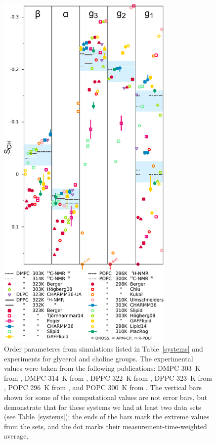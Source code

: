 \documentclass[journal=jacsat,manuscript=article]{achemso}
\begin{document}
\begin{figure}[]
  \includegraphics[width=8.6cm]{../DATAreportediINblog/comparisonSorted.pdf}
\newline
{}
  \caption{\label{HGorderparameters}
  Order parameteres from simulations listed in Table~\ref{systems} and experiments for glycerol and choline groups.
The experimental values were taken from the following publications:
 DMPC 303~K from \cite{gross97},
 DMPC 314~K from \cite{dvinskikh05a},
 DPPC 322~K from \cite{gally75},
 DPPC 323~K from \cite{akutsu81},
 POPC 296~K from \cite{bechinger91}, and
 POPC 300~K from \cite{ferreira13}.
  The vertical bars shown for some of the computational values are not error bars, but demonstrate that for 
these systems we had at least two data sets (see Table~\ref{systems});
the ends of the bars mark the extreme values from the sets, and the dot marks their measurement-time-weighted average. 
} 
\end{figure}
\end{document}
